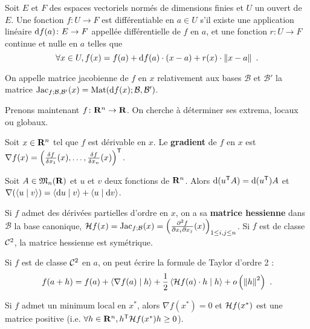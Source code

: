 \begin{defn}
	Soit $E$ et $F$ des espaces vectoriels normés de dimensions finies et $U$ un ouvert de $E$.
	Une fonction $f \colon U \to F$ est différentiable en $a \in U$ s'il existe une application linéaire $\mathop{}\mathopen{}\mathrm{d} f(a) \colon E \to F$ appellée différentielle de $f$ en $a$, et une fonction $r \colon U \to F$ continue et nulle en $a$ telles que
	$$\forall x \in U, f(x) = f(a) + \mathop{}\mathopen{}\mathrm{d} f(a) \cdot (x - a) + r(x) \cdot \left\lVert x - a\right\rVert\ .$$
\end{defn}

\begin{defn}
	On appelle matrice jacobienne de $f$ en $x$ relativement aux bases $\mathcal{B}$ et $\mathcal{B}'$ la matrice $\operatorname{Jac}_{f ; \mathcal{B}, \mathcal{B}'}(x) = \operatorname{Mat}( \mathop{}\mathopen{}\mathrm{d} f(x) ; \mathcal{B} , \mathcal{B}')$.
\end{defn}

Prenons maintenant $f \colon \mathbf{R}^n \to \mathbf{R}$. On cherche à déterminer ses extrema, locaux ou globaux.

\begin{defn}
	Soit $x \in \mathbf{R}^n$ tel que $f$ est dérivable en $x$.
	Le \textbf{gradient} de $f$ en $x$ est $\nabla f(x) = \left( \frac{\delta f}{\delta x_1}(x), \ldots, \frac{\delta f}{\delta x_n}(x) \right)^\mathsf{T}$.
\end{defn}

\begin{pop}
	Soit $A \in \mathfrak{M}_n(\mathbf{R})$ et $u$ et $v$ deux fonctions de $\mathbf{R}^n$.
	Alors $\mathop{}\mathopen{}\mathrm{d} (u^\mathsf{T} A) = \mathop{}\mathopen{}\mathrm{d}(u^\mathsf{T}) A$ et $\nabla (\left\langle u \mid v \right\rangle) = \left\langle \mathop{}\mathopen{}\mathrm{d} u \mid v \right\rangle + \left\langle u \mid \mathop{}\mathopen{}\mathrm{d} v \right\rangle$.
\end{pop}

\begin{defn}
	Si $f$ admet des dérivées partielles d'ordre en $x$, on a sa \textbf{matrice hessienne} dans $\mathcal{B}$ la base canonique, $\mathcal{H} f(x) = \operatorname{Jac}_{f ; \mathcal{B}}(x) = \left( \frac{\partial^2 f}{\partial x_i \partial x_j}(x) \right)_{1 \leq i,j \leq n}$.
	Si $f$ est de classe $\mathcal{C}^2$, la matrice hessienne est symétrique.
\end{defn}

\begin{pop}
	Si $f$ est de classe $\mathcal{C}^2$ en $a$, on peut écrire la formule de Taylor d'ordre 2 :
	$$f(a + h) = f(a) + \scal{\nabla f(a)}{h} + \frac{1}{2} \scal{\hess f(a) \cdot h}{h} + o \left( \norme{h}^2 \right)\ .$$
\end{pop}

\begin{thm}
	Si $f$ admet un minimum local en $x^*$, alors $\nabla f(x^*) = 0$ et $\mathcal{H} f(x^*)$ est une matrice positive (i.e. $\forall h \in \mathbf{R}^n, h^\mathsf{T} \mathcal{H} f(x^*) h \geq 0$).
\end{thm}

